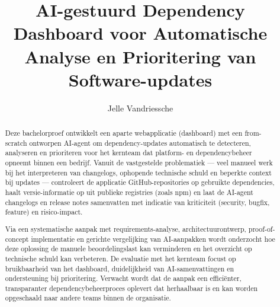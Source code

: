 \documentclass{hogent-article}
\title{AI-gestuurd Dependency Dashboard voor Automatische Analyse en Prioritering van Software-updates}
\author{Jelle Vandriessche}
\begin{document}
\begin{abstract}
  Deze bachelorproef ontwikkelt een aparte webapplicatie (dashboard) met een from-scratch ontworpen AI-agent om dependency-updates automatisch te detecteren, analyseren en prioriteren voor het kernteam dat platform- en dependencybeheer opneemt binnen een bedrijf. Vanuit de vastgestelde problematiek — veel manueel werk bij het interpreteren van changelogs, ophopende technische schuld en beperkte context bij updates — controleert de applicatie GitHub-repositories op gebruikte dependencies, haalt versie-informatie op uit publieke registries (zoals npm) en laat de AI-agent changelogs en release notes samenvatten met indicatie van kriticiteit (security, bugfix, feature) en risico-impact.

  Via een systematische aanpak met requirements-analyse, architectuurontwerp, proof-of-concept implementatie en gerichte vergelijking van AI-aanpakken wordt onderzocht hoe deze oplossing de manuele beoordelingslast kan verminderen en het overzicht op technische schuld kan verbeteren. De evaluatie met het kernteam focust op bruikbaarheid van het dashboard, duidelijkheid van AI-samenvattingen en ondersteuning bij prioritering. Verwacht wordt dat de aanpak een efficiënter, transparanter dependencybeheerproces oplevert dat herhaalbaar is en kan worden opgeschaald naar andere teams binnen de organisatie.
\end{abstract}

\tableofcontents



\printbibliography[heading=bibintoc]
\end{document}
